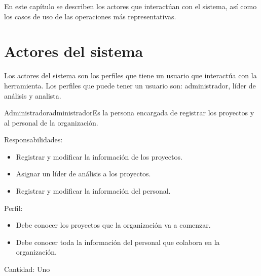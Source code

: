 En este capítulo se describen los actores que interactúan con el sistema, así como los casos de uso de las operaciones
más representativas.

\section{Actores del sistema}\label{sec:Comportamiento:ActoresSistema}
Los actores del sistema son los perfiles que tiene un usuario que interactúa con la herramienta. Los perfiles que puede tener un usuario
son: administrador, líder de análisis y analista.\\

\begin{actor}{Administrador}{administrador}{Es la persona encargada de registrar los proyectos y al personal de la organización.}
    \item[Responsabilidades:] \hspace{1pt}
    \begin{itemize}
	\item Registrar y modificar la información de los proyectos.
	\item Asignar un líder de análisis a los proyectos.
	\item Registrar y modificar la información del personal.
    \end{itemize}
    \item[Perfil:] \hspace{1pt}
    \begin{itemize}
	\item Debe conocer los proyectos que la organización va a  comenzar.
	\item Debe conocer toda la información del personal que colabora en la organización.
    \end{itemize}
    \item[Cantidad:] Uno
\end{actor}

